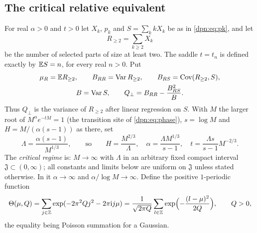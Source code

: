 \documentclass[11pt]{article}
\numberwithin{equation}{section}
\theoremstyle{definition}\newtheorem{definition}[theorem]{Definition}
\theoremstyle{remark}\newtheorem{remark}[theorem]{Remark}
\DeclareMathOperator{\Var}{Var}
\begin{document}
\subsection{The critical relative equivalent}\label{dpn:ct:sec:main}
For real $\alpha>0$ and $t>0$ let $X_k$, $p_k$ and $S=\sum_kkX_k$ be as in
\eqref{dpn:eq:pk}, and let
\begin{equation}\label{dpn:ct:eq:R}
 R_{\ge2}=\sum_{k\ge2}X_k
\end{equation}
be the number of selected parts of size at least two.  The saddle $t=t_n$ is
defined exactly by $\mathbb E S=n$, for every real $n>0$.  Put
\begin{equation}\label{dpn:ct:eq:quantities}
\begin{gathered}
 \mu_R=\E R_{\ge2},\qquad B_{RR}=\Var R_{\ge2},\qquad
 B_{RS}=\operatorname{Cov}(R_{\ge2},S),\\
 B=\Var S,\qquad Q_\perp=B_{RR}-\frac{B_{RS}^2}{B}.
\end{gathered}
\end{equation}
Thus $Q_\perp$ is the variance of $R_{\ge2}$ after linear regression on $S$.
With $M$ the larger root of $M^\alpha e^{-tM}=1$ (the transition site of
\eqref{dpn:eq:phase}), $s=\log M$ and $H=M/(\alpha(s-1))$ as there, set
\begin{equation}\label{dpn:ct:eq:scales}
 \Lambda=\frac{\alpha(s-1)}{M^{1/3}},\qquad\text{so}\qquad
 H=\frac{M^{2/3}}{\Lambda},\quad
 \alpha=\frac{\Lambda M^{1/3}}{s-1},\quad
 t=\frac{\Lambda s}{s-1}M^{-2/3}.
\end{equation}
The \emph{critical regime} is: $M\to\infty$ with $\Lambda$ in an arbitrary
fixed compact interval $\mathfrak J\subset(0,\infty)$; all constants and
limits below are uniform on $\mathfrak J$ unless stated otherwise.  In it
$\alpha\to\infty$ and $\alpha/\log M\to\infty$.  Define the positive
$1$-periodic function
\begin{equation}\label{dpn:ct:eq:Theta}
 \Theta(\mu,Q)=\sum_{j\in\mathbb Z}\exp(-2\pi^2Qj^2-2\pi\mathrm i j\mu)
 =\frac1{\sqrt{2\pi Q}}\sum_{l\in\mathbb Z}
   \exp\Bigl(-\frac{(l-\mu)^2}{2Q}\Bigr),\qquad Q>0,
\end{equation}
the equality being Poisson summation for a Gaussian.
\end{document}
